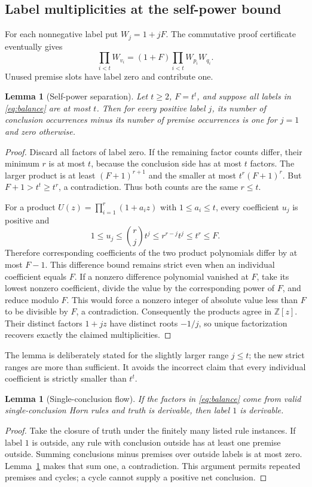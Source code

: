 \documentclass[11pt]{article}
\newtheorem{lemma}[theorem]{Lemma}
\theoremstyle{definition}
\newcommand{\Z}{\mathbb Z}
\begin{document}
\subsection{Label multiplicities at the self-power bound}

For each nonnegative label put $W_j=1+jF$. The commutative proof
certificate eventually gives
\begin{equation}\label{eq:balance}
\prod_{i<t}W_{v_i}=(1+F)\prod_{i<t}W_{p_i}W_{q_i}.
\end{equation}
Unused premise slots have label zero and contribute one.

\begin{lemma}[Self-power separation]\label{lem:separation}
Let $t\ge2$, $F=t^t$, and suppose all labels in
\eqref{eq:balance} are at most $t$. Then for every positive label $j$,
its number of conclusion occurrences minus its number of premise
occurrences is one for $j=1$ and zero otherwise.
\end{lemma}
\begin{proof}
Discard all factors of label zero. If the remaining factor counts
differ, their minimum $r$ is at most $t$, because the conclusion side
has at most $t$ factors. The larger product is at least
$(F+1)^{r+1}$ and the smaller at most $t^r(F+1)^r$. But
$F+1>t^t\ge t^r$, a contradiction. Thus both counts are the same
$r\le t$.

For a product $U(z)=\prod_{i=1}^r(1+a_i z)$ with
$1\le a_i\le t$, every coefficient $u_j$ is positive and
\[
1\le u_j\le\binom rj t^j\le r^{r-j}t^j\le t^r\le F.
\]
Therefore corresponding coefficients of the two product polynomials
differ by at most $F-1$. This difference bound remains strict even
when an individual coefficient equals $F$. If a nonzero difference
polynomial vanished at $F$, take its lowest nonzero coefficient,
divide the value by the corresponding power of $F$, and reduce
modulo $F$. This would force a nonzero integer of absolute value
less than $F$ to be divisible by $F$, a contradiction. Consequently
the products agree in $\Z[z]$. Their distinct factors $1+jz$ have
distinct roots $-1/j$, so unique factorization recovers exactly the
claimed multiplicities.
\end{proof}

The lemma is deliberately stated for the slightly larger range
$j\le t$; the new strict ranges are more than sufficient. It avoids
the incorrect claim that every individual coefficient is strictly
smaller than $t^t$.

\begin{lemma}[Single-conclusion flow]
If the factors in \eqref{eq:balance} come from valid single-conclusion
Horn rules and truth is derivable, then label $1$ is derivable.
\end{lemma}
\begin{proof}
Take the closure of truth under the finitely many listed rule
instances. If label $1$ is outside, any rule with conclusion outside
has at least one premise outside. Summing conclusions minus premises
over outside labels is at most zero. Lemma~\ref{lem:separation} makes
that sum one, a contradiction. This argument permits repeated
premises and cycles; a cycle cannot supply a positive net conclusion.
\end{proof}
\end{document}
